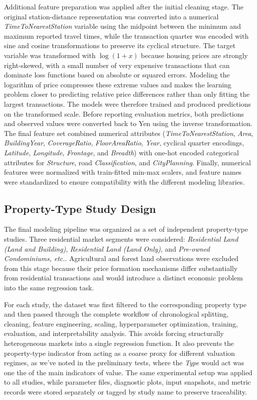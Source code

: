 \documentclass[12pt]{article}
\begin{document}
Additional feature preparation was applied after the initial cleaning stage. The original station-distance
representation was converted into a numerical \textit{TimeToNearestStation} variable using the midpoint between the
minimum and maximum reported travel times, while the transaction quarter was encoded with sine and cosine
transformations to preserve its cyclical structure. The target variable was transformed with $\log(1+x)$ because housing
prices are strongly right-skewed, with a small number of very expensive transactions that can dominate loss functions
based on absolute or squared errors. Modeling the logarithm of price compresses these extreme values and makes the
learning problem closer to predicting relative price differences rather than only fitting the largest transactions. The
models were therefore trained and produced predictions on the transformed scale. Before reporting evaluation metrics,
both predictions and observed values were converted back to Yen using the inverse transformation. The final feature set
combined numerical attributes (\textit{TimeToNearestStation}, \textit{Area}, \textit{BuildingYear},
\textit{CoverageRatio}, \textit{FloorAreaRatio}, \textit{Year}, cyclical quarter encodings, \textit{Latitude},
\textit{Longitude}, \textit{Frontage}, and \textit{Breadth}) with one-hot encoded categorical attributes for
\textit{Structure}, road \textit{Classification}, and \textit{CityPlanning}. Finally, numerical features were normalized
with train-fitted min-max scalers, and feature names were standardized to ensure compatibility with the different
modeling libraries.

\subsection{Property-Type Study Design}
The final modeling pipeline was organized as a set of independent property-type studies. Three residential market
segments were considered: \textit{Residential Land (Land and Building)}, \textit{Residential Land (Land Only)}, and
\textit{Pre-owned Condominiums, etc.}. Agricultural and forest land observations were excluded from this stage because
their price formation mechanisms differ substantially from residential transactions and would introduce a distinct
economic problem into the same regression task.

For each study, the dataset was first filtered to the corresponding property type and then passed through the complete
workflow of chronological splitting, cleaning, feature engineering, scaling, hyperparameter optimization, training,
evaluation, and interpretability analysis. This avoids forcing structurally heterogeneous markets into a single
regression function. It also prevents the property-type indicator from acting as a coarse proxy for different valuation
regimes, as we've noted in the preliminary tests, where the \textit{Type} would act was one the of the main indicators
of value. The same experimental setup was applied to all studies, while parameter files, diagnostic plots, input
snapshots, and metric records were stored separately or tagged by study name to preserve traceability.
\end{document}
